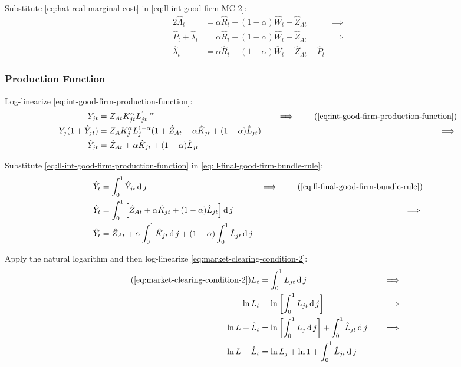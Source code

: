 \documentclass[
thesis.tex
]{subfiles}
\begin{document}
	Substitute \ref{eq:hat-real-marginal-cost} in \ref{eq:ll-int-good-firm-MC-2}:
	\begin{alignat}{2}
		\hat{\Lambda}_t &= \alpha \hat{R}_t + (1- \alpha) \hat{W}_t - \hat{Z}_{At} &\implies \nonumber \\
		\hat{P}_t + \hat{\lambda}_t &= \alpha \hat{R}_t + (1- \alpha) \hat{W}_t - \hat{Z}_{At} &\implies \nonumber \\
		\hat{\lambda}_t &= \alpha \hat{R}_t + (1- \alpha) \hat{W}_t - \hat{Z}_{At} - \hat{P}_t \label{eq:ll-int-good-firm-MC-3}
	\end{alignat}
	
	
	\subsubsection*{Production Function}
	
	Log-linearize \ref{eq:int-good-firm-production-function}:
	\begin{alignat}{2}
		Y_{jt} &= Z_{At} K_{jt}^\alpha L_{jt}^{1-\alpha} &\implies \tag{\ref{eq:int-good-firm-production-function}} \\
		Y_{j} (1+ \hat{Y}_{jt}) &= Z_{A} K_{j}^\alpha L_{j}^{1-\alpha} (1+ \hat{Z}_{At} + \alpha \hat{K}_{jt} + (1-\alpha) \hat{L}_{jt}) \quad &\implies \nonumber \\
		\hat{Y}_{jt} &= \hat{Z}_{At} + \alpha \hat{K}_{jt} + (1-\alpha) \hat{L}_{jt} \label{eq:ll-int-good-firm-production-function}
	\end{alignat}
	
	Substitute \ref{eq:ll-int-good-firm-production-function} in \ref{eq:ll-final-good-firm-bundle-rule}:
	\begin{alignat}{2}
		\hat{Y}_t &= \int_{0}^{1} \hat{Y}_{jt} \dif j &\implies \tag{\ref{eq:ll-final-good-firm-bundle-rule}} \\
		\hat{Y}_t &= \int_{0}^{1} \left[ \hat{Z}_{At} + \alpha \hat{K}_{jt} + (1-\alpha) \hat{L}_{jt} \right] \dif j &\implies \nonumber \\
		\hat{Y}_t &= \hat{Z}_{At} + \alpha \int_{0}^{1} \hat{K}_{jt} \dif j + (1-\alpha) \int_{0}^{1} \hat{L}_{jt} \dif j \label{eq:ll-final-good-firm-bundle-rule-2}
	\end{alignat}
	
	Apply the natural logarithm and then log-linearize \ref{eq:market-clearing-condition-2}:
	\begin{alignat}{2}
		\tag{\ref{eq:market-clearing-condition-2}}
		L_t &= \int_{0}^{1} L_{jt} \dif j &\implies \\
		\ln L_t &= \ln \left[ \int_{0}^{1} L_{jt} \dif j \right] &\implies \nonumber \\
		\ln L + \hat{L}_t &= \ln \left[ \int_{0}^{1} L_{j} \dif j \right] + \int_{0}^{1} \hat{L}_{jt} \dif j \quad &\implies \nonumber \\
		\ln L + \hat{L}_t &= \ln L_{j} + \ln 1 + \int_{0}^{1} \hat{L}_{jt} \dif j \nonumber
	\end{alignat}
	
\end{document}
